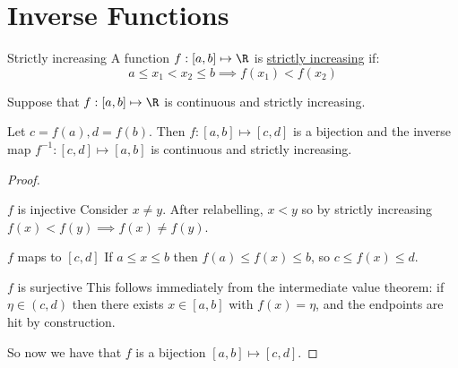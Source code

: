 \documentclass[../Main.tex]{subfiles}
\begin{document}
\section{Inverse Functions}
\begin{definition}{Strictly increasing}
    A function $f : [a, b] \mapsto \R$ is \underline{strictly increasing} if:
    \begin{equation*}
        a \leq x_1 < x_2 \leq b \implies f(x_1) < f(x_2)
    \end{equation*}
\end{definition}
\begin{theorem}
    Suppose that $f : [a, b] \mapsto \R$ is continuous and strictly increasing.\par
    Let $c = f(a), d = f(b)$. Then $f : [a, b] \mapsto [c, d]$ is a bijection and the inverse map $f^{-1} : [c, d] \mapsto [a, b]$ is continuous and strictly increasing.
\end{theorem}
\begin{proof}
    \begin{subproof}{$f$ is injective}
        Consider $x \neq y$. After relabelling, $x < y$ so by strictly increasing $f(x) < f(y) \implies f(x) \neq f(y)$.
    \end{subproof}
    \begin{subproof}{$f$ maps to $[c, d]$}
        If $a \leq x \leq b$ then $f(a) \leq f(x) \leq b$, so $c \leq f(x) \leq d$.
    \end{subproof}
    \begin{subproof}{$f$ is surjective}
        This follows immediately from the intermediate value theorem: if $\eta \in (c, d)$ then there exists $x \in [a, b]$ with $f(x) = \eta$, and the endpoints are hit by construction.
    \end{subproof}
    So now we have that $f$ is a bijection $[a, b] \mapsto [c, d]$.
\end{proof}
\end{document}

